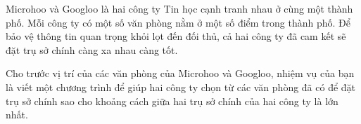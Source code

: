 Microhoo và Googloo là hai công ty Tin học cạnh tranh nhau ở cùng một thành phố. Mỗi công ty có một số văn phòng nằm ở một số điểm trong thành phố. Để bảo vệ thông tin quan trọng khỏi lọt đến đối thủ, cả hai công ty đã cam kết sẽ đặt trụ sở chính càng xa nhau càng tốt.  

   Cho trước vị trí của các văn phòng của Microhoo và Googloo, nhiệm vụ của bạn là viết một chương trình để giúp hai công ty chọn từ các văn phòng đã có để đặt trụ sở chính sao cho khoảng cách giữa hai trụ sở chính của hai công ty là lớn nhất.